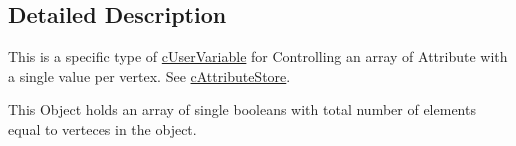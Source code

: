 \subsection{Detailed Description}
This is a specific type of \hyperlink{classc_user_variable}{cUserVariable} for Controlling an array of Attribute with a single value per vertex. See \hyperlink{classc_attribute_store}{cAttributeStore}. 

This Object holds an array of single booleans with total number of elements equal to verteces in the object. 